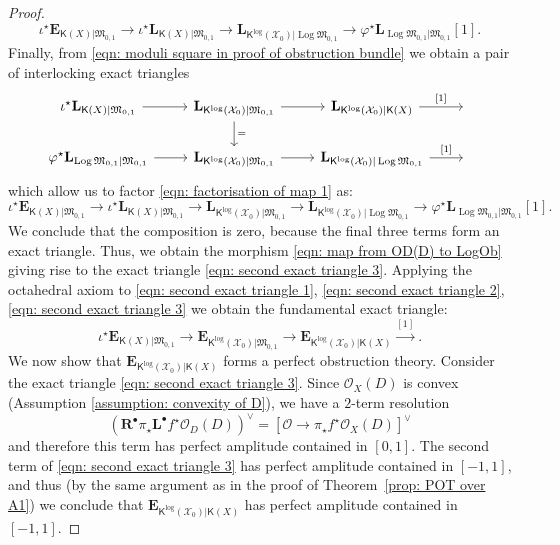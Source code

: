 \documentclass[11pt]{amsart}
\theoremstyle{definition}
\theoremstyle{definition}
\newcommand{\EE}{\mathbf{E}}
\newcommand{\LL}{\mathbf{L}}
\newcommand{\OO}{\mathcal{O}}
\newcommand{\Xcal}{\mathcal{X}}
\newcommand{\Mfrak}{\mathfrak{M}}
\newcommand{\Rder}{\mathbf{R}^\bullet}
\newcommand{\Lder}{\mathbf{L}^\bullet}
\newcommand{\Kup}{\mathsf{K}}
\newcommand{\Log}{\operatorname{Log}}
\begin{document}
\begin{proof}
\begin{equation} \label{eqn: factorisation of map 1} \iota^\star \EE_{\Kup(X)|\Mfrak_{0,1}} \to \iota^\star \LL_{\Kup(X)|\Mfrak_{0,1}} \to \LL_{\Kup^{\log}(\Xcal_0)|\Log\Mfrak_{0,1}} \to \varphi^\star \LL_{\Log\Mfrak_{0,1}|\Mfrak_{0,1}}[1].\end{equation}
Finally, from \eqref{eqn: moduli square in proof of obstruction bundle} we obtain a pair of interlocking exact triangles
\[
\begin{tikzcd}
\iota^\star \LL_{\Kup(X)|\Mfrak_{0,1}} \ar[r] & \LL_{\Kup^{\log}(\Xcal_0)|\Mfrak_{0,1}} \ar[r] \ar[d,"="] & \LL_{\Kup^{\log}(\Xcal_0)|\Kup(X)} \ar[r,"{[1]}"] & \, \\
\varphi^\star \LL_{\Log\Mfrak_{0,1}|\Mfrak_{0,1}} \ar[r] & \LL_{\Kup^{\log}(\Xcal_0)|\Mfrak_{0,1}} \ar[r] & \LL_{\Kup^{\log}(\Xcal_0)|\Log\Mfrak_{0,1}} \ar[r,"{[1]}"] &  \,
\end{tikzcd}
\]
which allow us to factor \eqref{eqn: factorisation of map 1} as:
\[ \iota^\star \EE_{\Kup(X)|\Mfrak_{0,1}} \to \iota^\star \LL_{\Kup(X)|\Mfrak_{0,1}} \to \LL_{\Kup^{\log}(\Xcal_0)|\Mfrak_{0,1}} \to \LL_{\Kup^{\log}(\Xcal_0)|\Log\Mfrak_{0,1}} \to \varphi^\star \LL_{\Log\Mfrak_{0,1}|\Mfrak_{0,1}}[1].\]
We conclude that the composition is zero, because the final three terms form an exact triangle. Thus, we obtain the morphism \eqref{eqn: map from OD(D) to LogOb} giving rise to the exact triangle \eqref{eqn: second exact triangle 3}. Applying the octahedral axiom to \eqref{eqn: second exact triangle 1}, \eqref{eqn: second exact triangle 2}, \eqref{eqn: second exact triangle 3} we obtain the fundamental exact triangle:
\begin{equation}\label{eqn: compatible triple for pushforward} \iota^\star \EE_{\Kup(X)|\Mfrak_{0,1}} \to \EE_{\Kup^{\log}(\Xcal_0)|\Mfrak_{0,1}} \to \EE_{\Kup^{\log}(\Xcal_0)|\Kup(X)}\xrightarrow{[1]}.\end{equation}
We now show that $\EE_{\Kup^{\log}(\Xcal_0)|\Kup(X)}$ forms a perfect obstruction theory. Consider the exact triangle \eqref{eqn: second exact triangle 3}. Since $\OO_X(D)$ is convex (Assumption \ref{assumption: convexity of D}), we have a $2$-term resolution
\begin{equation*}  (\Rder\pi_\star \Lder f^\star \OO_D(D))^\vee = [ \OO \to \pi_\star f^\star \OO_X(D)]^\vee
\end{equation*}
and therefore this term has perfect amplitude contained in $[0,1]$. The second term of \eqref{eqn: second exact triangle 3} has perfect amplitude contained in $[-1,1]$, and thus (by the same argument as in the proof of Theorem~\ref{prop: POT over A1}) we conclude that $\EE_{\Kup^{\log}(\Xcal_0)|\Kup(X)}$ has perfect amplitude contained in $[-1,1]$.


\end{proof}
\end{document}
